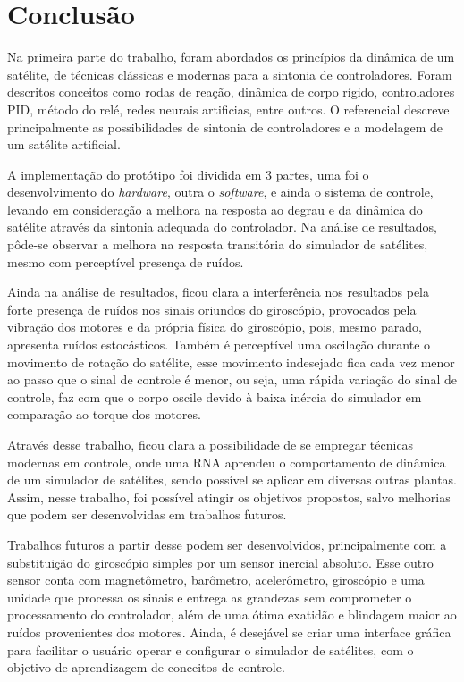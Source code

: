 \chapter[Conclusão]{Conclusão}

Na primeira parte do trabalho, foram abordados os princípios da dinâmica de um satélite, de técnicas clássicas e modernas para a sintonia de controladores. Foram descritos conceitos como rodas de reação, dinâmica de corpo rígido, controladores PID, método do relé, redes neurais artificias, entre outros. O referencial descreve principalmente as possibilidades de sintonia de controladores e a modelagem de um satélite artificial.

A implementação do protótipo foi dividida em 3 partes, uma foi o desenvolvimento do \textit{hardware}, outra o \textit{software}, e ainda o sistema de controle, levando em consideração a melhora na resposta ao degrau e da dinâmica do satélite através da sintonia adequada do controlador. Na análise de resultados, pôde-se observar a melhora na resposta transitória do simulador de satélites, mesmo com perceptível presença de ruídos.

Ainda na análise de resultados, ficou clara a interferência nos resultados pela forte presença de ruídos nos sinais oriundos do giroscópio, provocados pela vibração dos motores e da própria física do giroscópio, pois, mesmo parado, apresenta ruídos estocásticos. Também é perceptível uma oscilação durante o movimento de rotação do satélite, esse movimento indesejado fica cada vez menor ao passo que o sinal de controle é menor, ou seja, uma rápida variação do sinal de controle, faz com que o corpo oscile devido à baixa inércia do simulador em comparação ao torque dos motores.

Através desse trabalho, ficou clara a possibilidade de se empregar técnicas modernas em controle, onde uma RNA aprendeu o comportamento de dinâmica de um simulador de satélites, sendo possível se aplicar em diversas outras plantas. Assim, nesse trabalho, foi possível atingir os objetivos propostos, salvo melhorias que podem ser desenvolvidas em trabalhos futuros.

Trabalhos futuros a partir desse podem ser desenvolvidos, principalmente com a substituição do giroscópio simples por um sensor inercial absoluto. Esse outro sensor conta com magnetômetro, barômetro, acelerômetro, giroscópio e uma unidade que processa os sinais e entrega as grandezas sem comprometer o processamento do controlador, além de uma ótima exatidão e blindagem maior ao ruídos provenientes dos motores. Ainda, é desejável se criar uma interface gráfica para facilitar o usuário operar e configurar o simulador de satélites, com o objetivo de aprendizagem de conceitos de controle. 



